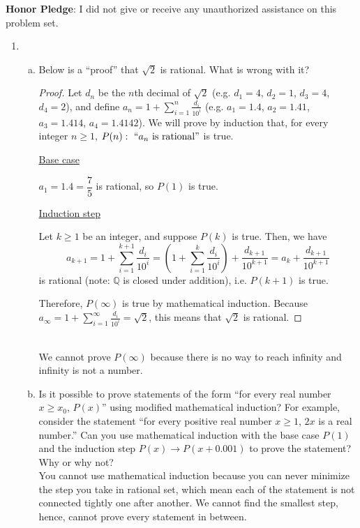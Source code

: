 \documentclass[12pt]{amsart}
\begin{document}
\vfill
\noindent
\textbf{Honor Pledge}: I did not give or receive any unauthorized assistance on this problem set.

\vspace{0.5in}
\hfill\makebox[3.0in]{\hrulefill}

\hfill{}

\newpage
\begin{enumerate}[{\bfseries 1.}]
\item\begin{enumerate}[(a)]
	\vspace{0.1in}
	\item Below is a ``proof'' that $\sqrt{2}$ is rational.  What is wrong with it?

		\vspace{0.1in}
		{\begin{proof}
		Let $d_{n}$ be the $n$th decimal of $\sqrt{2}$ (e.g. $d_{1}=4$, $d_{2}=1$, $d_{3}=4$, $d_{4}=2$), and define $\displaystyle a_{n}=1+\sum_{i=1}^{n}\frac{d_{i}}{10^{i}}$ (e.g. $a_{1}=1.4$, $a_{2}=1.41$, $a_{3}=1.414$, $a_{4}=1.4142$).  We will prove by induction that, for every integer $n\geq 1$,  $P(n):\ ``a_{n}\text{ is rational}"$ is true.
		
		\vspace{0.1in}
		\underline{Base case}

		$a_{1}=1.4=\dfrac{7}{5}$ is rational, so $P(1)$ is true.

		\vspace{0.1in}
		\underline{Induction step}

		Let $k\geq 1$ be an integer, and suppose $P(k)$ is true.  Then, we have
		$$\displaystyle a_{k+1}=1+\sum_{i=1}^{k+1}\frac{d_{i}}{10^{i}}=\left(1+\sum_{i=1}^{k}\frac{d_{i}}{10^{i}}\right)+\frac{d_{k+1}}{10^{k+1}}=a_{k}+\frac{d_{k+1}}{10^{k+1}}$$
		is rational (note: $\mathbb{Q}$ is closed under addition), i.e. $P(k+1)$ is true.
		
		\vspace{0.1in}
		Therefore, $P(\infty)$ is true by mathematical induction.  Because $\displaystyle a_{\infty}=1+\sum_{i=1}^{\infty}\frac{d_{i}}{10^{i}}=\sqrt{2}$, this means that $\sqrt{2}$ is rational.
		\end{proof}}
		\\We cannot prove $P(\infty)$ because there is no way to reach infinity and infinity is not a number.
		\vfill
	\vspace{0.1in}
	\item Is it possible to prove statements of the form ``for every real number $x\geq x_{0}$, $P(x)$'' using modified mathematical induction?  For example, consider the statement ``for every positive real number $x\geq 1$, $2x$ is a real number.''  Can you use mathematical induction with the base case $P(1)$ and the induction step $P(x)\to P(x+0.001)$ to prove the statement?  Why or why not?
		\\You cannot use mathematical induction because you can never minimize the step you take in rational set, which mean each of the statement is not connected tightly one after another. We cannot find the smallest step, hence, cannot prove every statement in between.
		\vfill
	\end{enumerate}


\end{enumerate}
\end{document}
